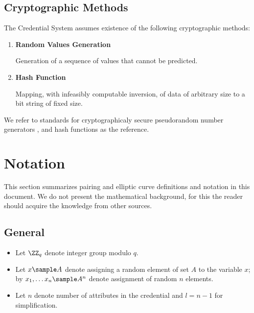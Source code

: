 \subsection{Cryptographic Methods}
The Credential System assumes existence of the following cryptographic methods:
\begin{enumerate}
    \item \textbf{Random Values Generation}
    
    Generation of a sequence of values that cannot be predicted.
    
    \item \textbf{Hash Function}
    
    Mapping, with infeasibly computable inversion, of data of arbitrary size to a bit string of fixed size.
\end{enumerate}

We refer to standards for cryptographicaly secure pseudorandom number generators \cite{nist-prng}, and hash functions \cite{nist-hash} as the reference.


\section{Notation}

This section summarizes pairing and elliptic curve definitions and notation in this document. We do not present the mathematical background, for this the reader should acquire the knowledge from other sources.


\subsection*{General}
\begin{itemize}[label=$\circ$]
    \item Let $\ZZ_q$ denote integer group modulo $q$.
    \item Let $x \sample A$ denote assigning a random element of set $A$ to the variable $x$; by $x_1, \dots x_n \sample A^n$ denote assignment of random $n$ elements. 
    \item Let $n$ denote number of attributes in the credential and $l = n - 1$ for simplification.
\end{itemize}


